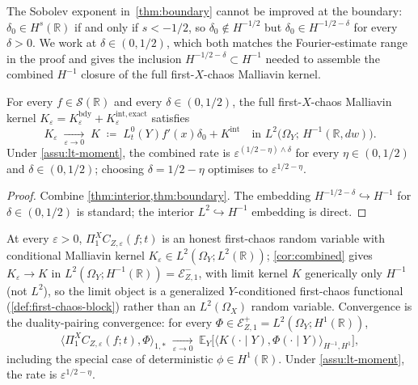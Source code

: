 \documentclass[EJP]{ejpecp}
\newcommand{\R}{\mathbb{R}}
\renewcommand{\E}{\mathbb{E}}
\newcommand{\Energy}{\mathcal{E}}
\newcommand{\IBM}{Z}
\newcommand{\Pir}{\Pi}
\begin{document}
The Sobolev exponent in~\cref{thm:boundary} cannot be improved at
the boundary: $\delta_0\in H^{s}(\R)$ if and only if $s<-1/2$, so
$\delta_0\notin H^{-1/2}$ but $\delta_0\in H^{-1/2-\delta}$ for
every $\delta>0$. We work at $\delta\in(0,1/2)$, which both matches
the Fourier-estimate range in the proof and gives the inclusion
$H^{-1/2-\delta}\subset H^{-1}$ needed to assemble the combined
$H^{-1}$ closure of the full first-$X$-chaos Malliavin kernel.

\begin{corollary}
\label{cor:combined}
For every $f\in\mathscr S(\R)$ and every $\delta\in(0,1/2)$, the
full first-$X$-chaos Malliavin kernel
\(K_{\varepsilon}=K_{\varepsilon}^{\mathrm{bdy}}+K_{\varepsilon}^{\mathrm{int,exact}}\)
satisfies
\[
 K_{\varepsilon}\;\xrightarrow[\varepsilon\to 0]{}\;K
 \;\coloneqq\;L_{t}^{0}(Y)f'(x)\delta_{0}+K^{\mathrm{int}}
 \quad\text{in }L^{2}\bigl(\Omega_{Y};\,H^{-1}(\R,dw)\bigr).
\]
Under \cref{assu:lt-moment}, the combined rate is
$\varepsilon^{(1/2-\eta)\wedge\delta}$ for every $\eta\in(0,1/2)$ and
$\delta\in(0,1/2)$; choosing $\delta=1/2-\eta$ optimises to
$\varepsilon^{1/2-\eta}$.
\end{corollary}

\begin{proof}
Combine \cref{thm:interior,thm:boundary}. The embedding
$H^{-1/2-\delta}\hookrightarrow H^{-1}$ for $\delta\in(0,1/2)$ is
standard; the interior $L^{2}\hookrightarrow H^{-1}$ embedding is
direct.
\end{proof}

\begin{corollary}[First-chaos dual closure of $\Pir_1^{X}C_{\IBM,\varepsilon}$]
\label{cor:proj1-closure}
At every $\varepsilon>0$, $\Pir_1^{X}C_{\IBM,\varepsilon}(f;t)$ is
an honest first-chaos random variable with conditional Malliavin
kernel $K_\varepsilon\in L^{2}(\Omega_{Y};L^{2}(\R))$;
\cref{cor:combined} gives $K_\varepsilon\to K$ in
$L^{2}(\Omega_{Y};H^{-1}(\R))=\Energy_{\IBM,1}^{-}$, with limit
kernel $K$ generically only $H^{-1}$ (not $L^{2}$), so the limit
object is a generalized $Y$-conditioned first-chaos functional
(\cref{def:first-chaos-block}) rather than an $L^{2}(\Omega_X)$
random variable. Convergence is the duality-pairing convergence:
for every $\Phi\in\Energy_{\IBM,1}^{+}=L^{2}(\Omega_Y;H^{1}(\R))$,
\[
 \bigl\langle\Pir_{1}^{X}C_{\IBM,\varepsilon}(f;t),\Phi\bigr\rangle_{1,*}
 \;\xrightarrow[\varepsilon\to 0]{}\;
 \E_{Y}\!\bigl[\langle K(\cdot\mid Y),\Phi(\cdot\mid Y)\rangle_{H^{-1},H^{1}}\bigr],
\]
including the special case of deterministic $\phi\in H^{1}(\R)$.
Under \cref{assu:lt-moment}, the rate is $\varepsilon^{1/2-\eta}$.
\end{corollary}
\end{document}
